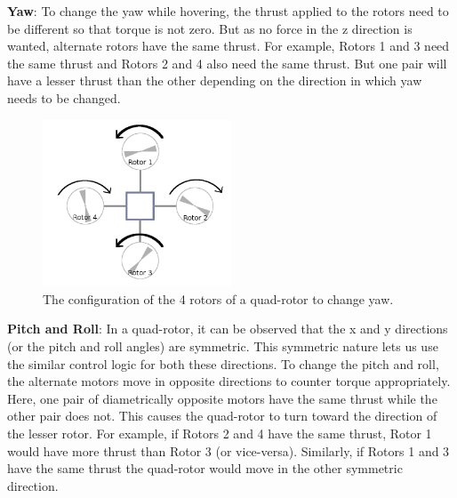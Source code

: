 \documentclass[hidelinks,BTech]{iitmdiss}
\begin{document}
{\bf Yaw}: To change the yaw while hovering, the thrust applied to the rotors need to be different so that torque is not zero. But as no force in the z direction is wanted, alternate rotors have the same thrust. For example, Rotors 1 and 3 need the same thrust and Rotors 2 and 4 also need the same thrust. But one pair will have a lesser thrust than the other depending on the direction in which yaw needs to be changed.

\begin{figure}[H]
  \centering
    \includegraphics[width=0.5\textwidth]{quadrotor_rotors_yaw.png}
    \caption{The configuration of the 4 rotors of a quad-rotor to change yaw.}
\end{figure}

{\bf Pitch and Roll}: In a quad-rotor, it can be observed that the x and y directions (or the pitch and roll angles) are symmetric. This symmetric nature lets us use the similar control logic for both these directions. To change the pitch and roll, the alternate motors move in opposite directions to counter torque appropriately. Here, one pair of diametrically opposite motors have the same thrust while the other pair does not. This causes the quad-rotor to turn toward the direction of the lesser rotor. For example, if Rotors 2 and 4 have the same thrust, Rotor 1 would have more thrust than Rotor 3 (or vice-versa). Similarly, if Rotors 1 and 3 have the same thrust the quad-rotor would move in the other symmetric direction.
\end{document}
